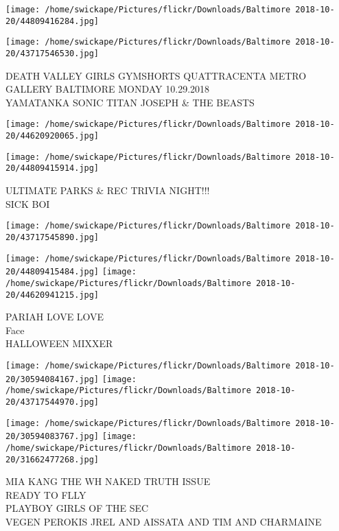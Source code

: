 \documentclass[10pt,letterpaper]{article}
\begin{document}
\texttt{[image: /home/swickape/Pictures/flickr/Downloads/Baltimore 2018-10-20/44809416284.jpg]}

\vspace{0.25in}
\texttt{[image: /home/swickape/Pictures/flickr/Downloads/Baltimore 2018-10-20/43717546530.jpg]}

DEATH VALLEY GIRLS GYMSHORTS QUATTRACENTA METRO GALLERY BALTIMORE MONDAY 10.29.2018\\
YAMATANKA SONIC TITAN JOSEPH \& THE BEASTS\\
\pagebreak

\texttt{[image: /home/swickape/Pictures/flickr/Downloads/Baltimore 2018-10-20/44620920065.jpg]}

\vspace{0.25in}
\texttt{[image: /home/swickape/Pictures/flickr/Downloads/Baltimore 2018-10-20/44809415914.jpg]}

ULTIMATE PARKS \& REC TRIVIA NIGHT!!!\\
SICK BOI\\
\pagebreak

\texttt{[image: /home/swickape/Pictures/flickr/Downloads/Baltimore 2018-10-20/43717545890.jpg]}

\vspace{0.25in}
\texttt{[image: /home/swickape/Pictures/flickr/Downloads/Baltimore 2018-10-20/44809415484.jpg]}
\texttt{[image: /home/swickape/Pictures/flickr/Downloads/Baltimore 2018-10-20/44620941215.jpg]}

PARIAH LOVE LOVE\\
Face\\
HALLOWEEN MIXXER\\
\pagebreak

\texttt{[image: /home/swickape/Pictures/flickr/Downloads/Baltimore 2018-10-20/30594084167.jpg]}
\texttt{[image: /home/swickape/Pictures/flickr/Downloads/Baltimore 2018-10-20/43717544970.jpg]}

\texttt{[image: /home/swickape/Pictures/flickr/Downloads/Baltimore 2018-10-20/30594083767.jpg]}
\texttt{[image: /home/swickape/Pictures/flickr/Downloads/Baltimore 2018-10-20/31662477268.jpg]}

MIA KANG THE WH NAKED TRUTH ISSUE\\
READY TO FLLY\\
PLAYBOY GIRLS OF THE SEC\\
VEGEN PEROKIS JREL AND AISSATA AND TIM AND CHARMAINE\\
\pagebreak
\end{document}
